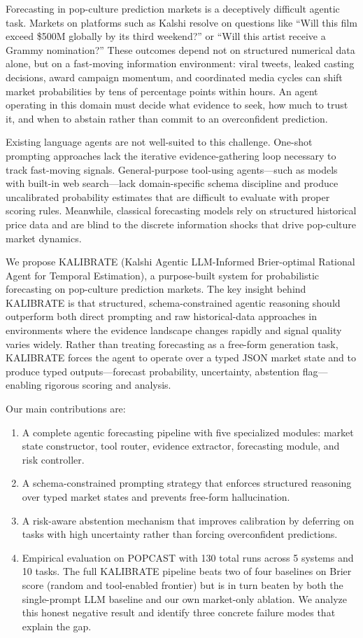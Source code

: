 \documentclass{article} %
\newcommand{\agentname}{KALIBRATE}
\newcommand{\benchmarkname}{POPCAST}
\newcommand{\kalshi}{Kalshi}
\begin{document}
Forecasting in pop-culture prediction markets is a deceptively difficult agentic task. Markets on platforms such as \kalshi{} resolve on questions like ``Will this film exceed \$500M globally by its third weekend?'' or ``Will this artist receive a Grammy nomination?'' These outcomes depend not on structured numerical data alone, but on a fast-moving information environment: viral tweets, leaked casting decisions, award campaign momentum, and coordinated media cycles can shift market probabilities by tens of percentage points within hours. An agent operating in this domain must decide what evidence to seek, how much to trust it, and when to abstain rather than commit to an overconfident prediction.

Existing language agents are not well-suited to this challenge. One-shot prompting approaches lack the iterative evidence-gathering loop necessary to track fast-moving signals. General-purpose tool-using agents—such as models with built-in web search—lack domain-specific schema discipline and produce uncalibrated probability estimates that are difficult to evaluate with proper scoring rules. Meanwhile, classical forecasting models rely on structured historical price data and are blind to the discrete information shocks that drive pop-culture market dynamics.

We propose \agentname{} (Kalshi Agentic LLM-Informed Brier-optimal Rational Agent for Temporal Estimation), a purpose-built system for probabilistic forecasting on pop-culture prediction markets. The key insight behind \agentname{} is that structured, schema-constrained agentic reasoning should outperform both direct prompting and raw historical-data approaches in environments where the evidence landscape changes rapidly and signal quality varies widely. Rather than treating forecasting as a free-form generation task, \agentname{} forces the agent to operate over a typed JSON market state and to produce typed outputs—forecast probability, uncertainty, abstention flag—enabling rigorous scoring and analysis.

Our main contributions are:
\begin{enumerate}[noitemsep]
    \item A complete agentic forecasting pipeline with five specialized modules: market state constructor, tool router, evidence extractor, forecasting module, and risk controller.
    \item A schema-constrained prompting strategy that enforces structured reasoning over typed market states and prevents free-form hallucination.
    \item A risk-aware abstention mechanism that improves calibration by deferring on tasks with high uncertainty rather than forcing overconfident predictions.
    \item Empirical evaluation on \benchmarkname{} with 130 total runs across 5 systems and 10 tasks. The full \agentname{} pipeline beats two of four baselines on Brier score (random and tool-enabled frontier) but is in turn beaten by both the single-prompt LLM baseline and our own market-only ablation. We analyze this honest negative result and identify three concrete failure modes that explain the gap.
\end{enumerate}
\end{document}
